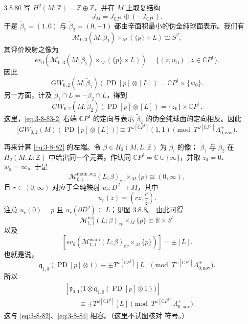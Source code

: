 \begin{example}{3.8.80}
写
$H^2(M;\mathbb Z)=\mathbb Z\oplus\mathbb Z$，并在 $M$ 上取复结构
\[
 J_M=J_{\mathbb CP^1}\oplus(-J_{\mathbb CP^1}).
\]
于是 $\widetilde\beta_1=(1,0)$ 与
$\widetilde\beta_2=(0,-1)$ 都由辛面积最小的伪全纯球面表示。我们有
\[
 \mathcal M_{0,3}(M;\widetilde\beta_1)
 \mathbin{\times_M}(\{p\}\times L)
 \cong S^2,
\]
其评价映射之像为
\[
 ev_0\left(
 \mathcal M_{0,3}(M;\widetilde\beta_1)
 \mathbin{\times_M}(\{p\}\times L)
 \right)
 =\{(z,w_0)\mid z\in\mathbb CP^1\}.
\]
因此
\begin{equation}
 GW_{0,2}(M;\widetilde\beta_1)
 (\operatorname{PD}[p]\otimes[L])
 =\mathbb CP^1\times\{w_0\}.
\tag{3.8.83.1}\label{eq:3-8-83-1}
\end{equation}
另一方面，计及
$\widetilde\beta_1\cap L=-\widetilde\beta_2\cap L$，得到
\begin{equation}
 GW_{0,2}(M;\widetilde\beta_2)
 (\operatorname{PD}[p]\otimes[L])
 =\{z_0\}\times\mathbb CP^1.
\tag{3.8.83.2}\label{eq:3-8-83-2}
\end{equation}
这里，\eqref{eq:3-8-83-2} 右端 $\mathbb CP^1$ 的定向与表示
$\widetilde\beta_2$ 的伪全纯球面的定向相反。因此
\begin{equation}
 \bigl[GW_{0,2}(M)(\operatorname{PD}[p]\otimes[L])\bigr]
 \equiv T^{\omega[\mathbb CP^1]}(1,1)
 \pmod{T^{\omega[\mathbb CP^1]}\Lambda^+_{0,\mathrm{nov}}}.
\tag{3.8.84}\label{eq:3-8-84}
\end{equation}

再来计算 \eqref{eq:3-8-82} 的左端。令
$\beta\in H_2(M,L;\mathbb Z)$ 为 $\widetilde\beta_i$ 的像；
$\widetilde\beta_1$ 与 $\widetilde\beta_2$ 在
$H_2(M,L;\mathbb Z)$ 中给出同一个元素。作认同
$\mathbb CP^1=\mathbb C\cup\{\infty\}$，并取
$z_0=0$、$w_0=\infty$。于是
\begin{equation}
 \mathcal M_{0,1}^{\mathrm{main,reg}}(L;\beta)_{ev}
 \mathbin{\times_M}\{p\}
 \cong(0,\infty),
\tag{3.8.85}\label{eq:3-8-85}
\end{equation}
且 $r\in(0,\infty)$ 对应于全纯映射
$u_r\colon D^2\to M$，其中
\[
 u_r(z)=\left(rz,\frac r{\overline z}\right).
\]
注意 $u_r(0)=p$ 且 $u_r(\partial D^2)\subseteq L$；见图 3.8.8。
由此可得
\[
 \mathcal M_{1,1}^{\mathrm{reg}}(L;\beta)_{ev}
 \mathbin{\times_M}\{p\}
 \cong\mathbb R\times S^1
\]
以及
\[
 \left[
 ev_0\left(
 \mathcal M_{1,1}^{\mathrm{main}}(L;\beta)_{ev}
 \mathbin{\times_M}\{p\}
 \right)
 \right]=\pm[L].
\]
也就是说，
\[
 \mathfrak q_{1,0}(\operatorname{PD}[p]\otimes1)
 \equiv\pm T^{\omega[\mathbb CP^1]}[L]
 \pmod{T^{\omega[\mathbb CP^1]}\Lambda^+_{0,\mathrm{nov}}}.
\]
所以
\begin{equation}
\begin{aligned}
 &\left[
 \mathfrak p_{0,1}\bigl(
 1\otimes\mathfrak q_{1,0}(\operatorname{PD}[p]\otimes1)
 \bigr)
 \right]\\
 &\qquad\equiv
 \pm T^{\omega[\mathbb CP^1]}[L]
 \pmod{T^{\omega[\mathbb CP^1]}\Lambda^+_{0,\mathrm{nov}}}.
\end{aligned}
\tag{3.8.86}\label{eq:3-8-86}
\end{equation}
这与 \eqref{eq:3-8-82}、\eqref{eq:3-8-84} 相容。（这里不试图核对
符号。）


\end{example}
